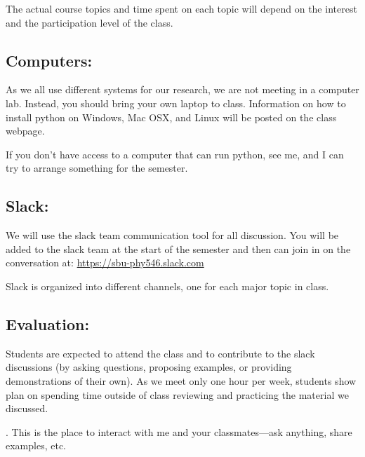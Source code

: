\documentclass[11pt]{article}
\begin{document}
\noindent The actual course topics and time spent on each topic will depend on the
interest and the participation level of the class.


\subsection*{Computers:}
%
As we all use different systems for our research, we are not meeting
in a computer lab.  Instead, you should bring your own laptop to
class.  Information on how to install python on Windows, Mac OSX, and
Linux will be posted on the class webpage.

\noindent
If you don't have access to a computer that can run python, see me,
and I can try to arrange something for the semester.


\subsection*{Slack:}
%
We will use the slack team communication tool for all discussion.  You
will be added to the slack team at the start of the semester and then
can join in on the conversation at:
\url{https://sbu-phy546.slack.com}

Slack is organized into different channels, one for each major topic in class.


\subsection*{Evaluation:}

Students are expected to attend the class and to contribute
to the slack discussions (by asking questions, proposing examples, or
providing demonstrations of their own).  As we meet only one hour per
week, students show plan on spending time outside of class reviewing
and practicing the material we discussed.

.  This is the place to interact with
me and your classmates---ask anything, share examples, etc.
\end{document}

